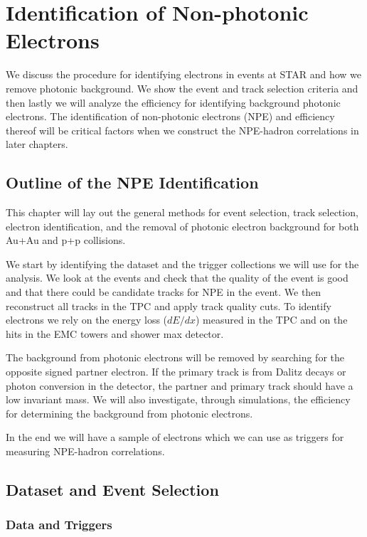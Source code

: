 \chapter{Identification of Non-photonic Electrons}

We discuss the procedure for identifying electrons in events at STAR and how we remove photonic background. We show the event and track selection criteria and then lastly we will analyze the efficiency for identifying background photonic electrons. The identification of non-photonic electrons (NPE) and efficiency thereof will be critical factors when we construct the NPE-hadron correlations in later chapters.

\section{Outline of the NPE Identification}

This chapter will lay out the general methods for event selection, track selection, electron identification, and the removal of photonic electron background for both Au+Au and p+p collisions.

We start by identifying the dataset and the trigger collections we will use for the analysis. We look at the events and check that the quality of the event is good and that there could be candidate tracks for NPE in the event. We then reconstruct all tracks in the TPC and apply track quality cuts. To identify electrons we rely on the energy loss ($dE/dx$) measured in the TPC and on the hits in the EMC towers and shower max detector. 

The background from photonic electrons will be removed by searching for the opposite signed partner electron. If the primary track is from Dalitz decays or photon conversion in the detector, the partner and primary track should have a low invariant mass. We will also investigate, through simulations, the efficiency for determining the background from photonic electrons.

In the end we will have a sample of electrons which we can use as triggers for measuring NPE-hadron correlations. 

\section{Dataset and Event Selection}

\subsection{Data and Triggers}

